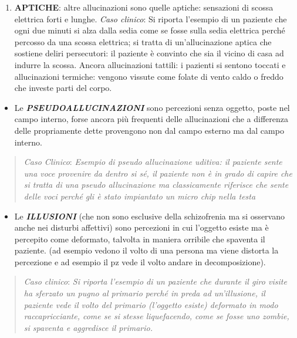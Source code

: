 \documentclass[]{article}
\begin{document}
\begin{enumerate}
\def\labelenumi{\arabic{enumi}.}
\item
  \textbf{APTICHE}: altre allucinazioni sono quelle aptiche: sensazioni
  di scossa elettrica forti e lunghe. \emph{Caso clinico}: Si riporta
  l'esempio di un paziente che ogni due minuti si alza dalla sedia come
  se fosse sulla sedia elettrica perché percosso da una scossa
  elettrica; si tratta di un'allucinazione aptica che sostiene deliri
  persecutori: il paziente è convinto che sia il vicino di casa ad
  indurre la scossa. Ancora allucinazioni tattili: i pazienti si sentono
  toccati e allucinazioni termiche: vengono vissute come folate di vento
  caldo o freddo che investe parti del corpo.
\end{enumerate}

\begin{itemize}
\item
  Le \textbf{\emph{PSEUDOALLUCINAZIONI}} sono percezioni senza oggetto,
  poste nel campo interno, forse ancora più frequenti delle
  allucinazioni che a differenza delle propriamente dette provengono non
  dal campo esterno ma dal campo interno.
\end{itemize}

\begin{quote}
\emph{Caso Clinico}: \emph{Esempio di pseudo allucinazione uditiva: il
paziente sente una voce provenire da dentro si sé, il paziente non è in
grado di capire che si tratta di una pseudo allucinazione ma
classicamente riferisce che sente delle voci perché gli è stato
impiantato un micro chip nella testa}
\end{quote}

\begin{itemize}
\item
  Le \textbf{\emph{ILLUSIONI}} (che non sono esclusive della
  schizofrenia ma si osservano anche nei disturbi affettivi) sono
  percezioni in cui l'oggetto esiste ma è percepito come deformato,
  talvolta in maniera orribile che spaventa il paziente. (ad esempio
  vedono il volto di una persona ma viene distorta la percezione e ad
  esempio il pz vede il volto andare in decomposizione).
\end{itemize}

\begin{quote}
\emph{Caso clinico}: \emph{Si riporta l'esempio di un paziente che
durante il giro visite ha sferzato un pugno al primario perché in preda
ad un'illusione, il paziente vede il volto del primario (l'oggetto
esiste) deformato in modo raccapricciante, come se si stesse
liquefacendo, come se fosse uno zombie, si spaventa e aggredisce il
primario. }
\end{quote}
\end{document}
